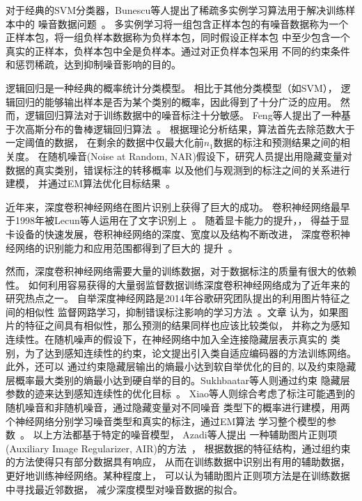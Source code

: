 对于经典的SVM分类器，Bunescu等人提出了稀疏多实例学习算法用于解决训练样本中的
噪音数据问题~\cite{bunescu2007multiple,vijayanarasimhan2008keywords}。
多实例学习将一组包含正样本包的有噪音数据称为一个正样本包，将一组负样本数据称为负样本包，同时假设正样本包
中至少包含一个真实的正样本，负样本包中全是负样本。通过对正负样本包采用
不同的约束条件和惩罚稀疏，达到抑制噪音影响的目的。

逻辑回归是一种经典的概率统计分类模型。 相比于其他分类模型（如SVM），
逻辑回归的能够输出样本是否为某个类别的概率，因此得到了十分广泛的应用。
然而，逻辑回归算法对于训练数据中的噪音标注十分敏感。
Feng等人提出了一种基于次高斯分布的鲁棒逻辑回归算法~\cite{feng2014robust}。
根据理论分析结果，算法首先去除范数大于一定阈值的数据，
在剩余的数据中仅最大化前$n_1$数据的标注和预测结果之间的相关度。
在随机噪音(Noise at Random, NAR)假设下，研究人员提出用隐藏变量对数据的真实类别，错误标注的转移概率
以及他们与观测到的标注之间的关系进行建模，
并通过EM算法优化目标结果~\cite{izadinia2014image,izadinia2015deep}。

近年来，深度卷积神经网络在图片识别上获得了巨大的成功。
卷积神经网络最早于1998年被Lecun等人运用在了文字识别上~\cite{lecun1998gradient}。
随着显卡能力的提升，，
得益于显卡设备的快速发展，卷积神经网络的深度、宽度以及结构不断改进，
深度卷积神经网络的识别能力和应用范围都得到了巨大的
提升~\cite{krizhevsky2012imagenet,simonyan2014very,szegedy2015going,szegedy2016rethinking,szegedy2016inception,he2016deep}。

然而，深度卷积神经网络需要大量的训练数据，对于数据标注的质量有很大的依赖性。
如何利用容易获得的大量弱监督数据训练深度卷积神经网络成为了近年来的研究热点之一。
自举深度神经网路是2014年谷歌研究团队提出的利用图片特征之间的相似性
监督网路学习，抑制错误标注影响的学习方法~\cite{reed2014training}。文章
认为，如果图片的特征之间具有相似性，那么预测的结果同样也应该比较类似，
并称之为感知连续性。在随机噪声的假设下，在神经网络中加入全连接隐藏层表示真实的
类别，为了达到感知连续性的约束，论文提出引入类自适应编码器的方法训练网络。此外，还可以
通过约束隐藏层输出的熵最小达到软自举优化的目的,
以及约束隐藏层概率最大类别的熵最小达到硬自举的目的。Sukhbaatar等人则通过约束
隐藏层参数的迹来达到感知连续性的优化目标~\cite{sukhbaatar2014training}。
Xiao等人则综合考虑了标注可能遇到的随机噪音和非随机噪音，通过隐藏变量对不同噪音
类型下的概率进行建模，用两个神经网络分别学习噪音类型和真实的标注，通过EM算法
学习整个模型的参数~\cite{xiao2015learning}。
以上方法都基于特定的噪音模型， Azadi等人提出
一种辅助图片正则项(Auxiliary Image Regularizer, AIR)的方法~\cite{azadi2015auxiliary}，
根据数据的特征结构，通过组约束的方法使得只有部分数据具有响应，
从而在训练数据中识别出有用的辅助数据，更好地训练神经网络。某种程度上，
可以认为辅助图片正则项方法是在训练数据中寻找最近邻数据，
减少深度模型对噪音数据的拟合。

